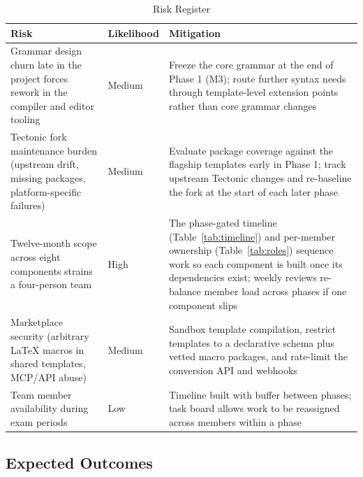 \documentclass[a4paper,twoside]{article}
\begin{document}
\begin{table}[H]
  \centering
  \begin{tabularx}{\textwidth}{L l L}
    \toprule
    \textbf{Risk} & \textbf{Likelihood} & \textbf{Mitigation} \\
    \midrule
    Grammar design churn late in the project forces rework in the compiler and editor tooling & Medium & Freeze the core grammar at the end of Phase 1 (M3); route further syntax needs through template-level extension points rather than core grammar changes \\
    Tectonic fork maintenance burden (upstream drift, missing packages, platform-specific failures) & Medium & Evaluate package coverage against the flagship templates early in Phase 1; track upstream Tectonic changes and re-baseline the fork at the start of each later phase \\
    Twelve-month scope across eight components strains a four-person team & High & The phase-gated timeline (Table~\ref{tab:timeline}) and per-member ownership (Table~\ref{tab:roles}) sequence work so each component is built once its dependencies exist; weekly reviews re-balance member load across phases if one component slips \\
    Marketplace security (arbitrary LaTeX macros in shared templates, MCP/API abuse) & Medium & Sandbox template compilation, restrict templates to a declarative schema plus vetted macro packages, and rate-limit the conversion API and webhooks \\
    Team member availability during exam periods & Low & Timeline built with buffer between phases; task board allows work to be reassigned across members within a phase \\
    \bottomrule
  \end{tabularx}
  \caption{Risk Register}
  \label{tab:risks}
\end{table}

\subsection{Expected Outcomes}
\end{document}
